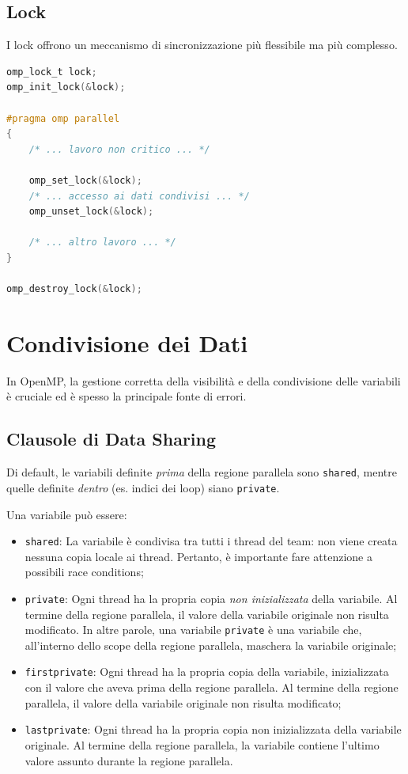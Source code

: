 \subsection{Lock}
I lock offrono un meccanismo di sincronizzazione più flessibile ma più complesso.
\begin{lstlisting}[language=C, numbers=none]
omp_lock_t lock;
omp_init_lock(&lock);

#pragma omp parallel
{
    /* ... lavoro non critico ... */

    omp_set_lock(&lock);
    /* ... accesso ai dati condivisi ... */
    omp_unset_lock(&lock);

    /* ... altro lavoro ... */
}

omp_destroy_lock(&lock);
\end{lstlisting}

\section{Condivisione dei Dati}
In OpenMP, la gestione corretta della visibilità e della condivisione delle variabili è cruciale ed è spesso la principale fonte di errori.

\subsection{Clausole di Data Sharing}
Di default, le variabili definite \emph{prima} della regione parallela sono \texttt{shared}, mentre quelle definite \emph{dentro} (es. indici dei loop) siano \texttt{private}. 

Una variabile può essere: 
\begin{itemize}
    \item \texttt{shared}: La variabile è condivisa tra tutti i thread del team: non viene creata nessuna copia locale ai thread. Pertanto, è importante fare attenzione a possibili race conditions;
    \item \texttt{private}: Ogni thread ha la propria copia \emph{non inizializzata} della variabile. Al termine della regione parallela, il valore della variabile originale non risulta modificato. In altre parole, una variabile \texttt{private} è una variabile che, all'interno dello scope della regione parallela, maschera la variabile originale;
    \item \texttt{firstprivate}: Ogni thread ha la propria copia della variabile, inizializzata con il valore che aveva prima della regione parallela. Al termine della regione parallela, il valore della variabile originale non risulta modificato;
    \item \texttt{lastprivate}: Ogni thread ha la propria copia non inizializzata della variabile originale. Al termine della regione parallela, la variabile contiene l'ultimo valore assunto durante la regione parallela.
\end{itemize}


